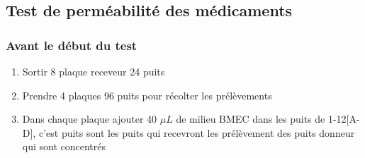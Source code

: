 \subsection{Test de perméabilité des médicaments}

\subsubsection{Avant le début du test}

\begin{enumerate}
\item Sortir 8 plaque receveur 24 puits 
\item Prendre 4 plaques 96 puits pour récolter les prélèvements
\item Dans chaque plaque ajouter 40 $\mu L$ de milieu BMEC dans les puits de 1-12[A-D], c'est puits sont les puits qui recevront les prélèvement des puits donneur qui sont concentrés
\end{enumerate}


